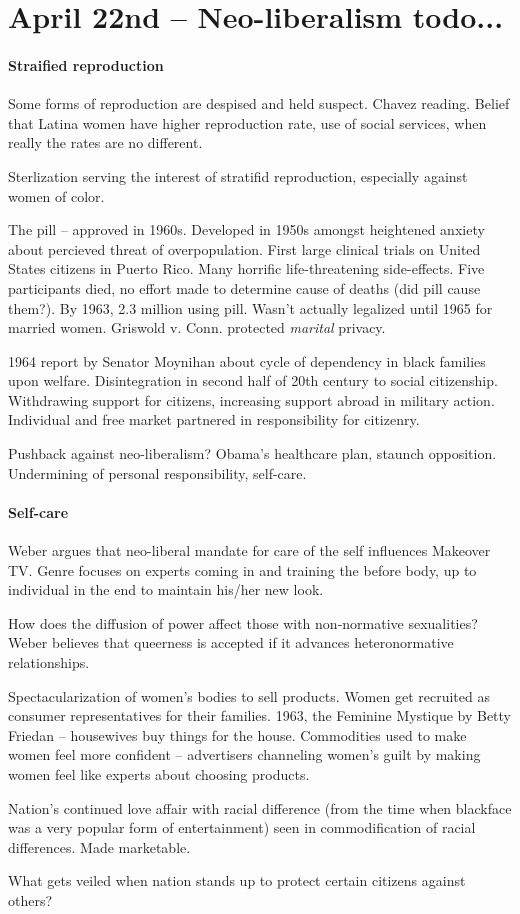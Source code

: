\section{April 22nd -- Neo-liberalism todo... }

\paragraph{Straified reproduction} Some forms of reproduction are despised and held suspect. Chavez reading. Belief that Latina women have higher reproduction rate, use of social services, when really the rates are no different.

Sterlization serving the interest of stratifid reproduction, especially against women of color.

The pill -- approved in 1960s. Developed in 1950s amongst heightened anxiety about percieved threat of overpopulation. First large clinical trials on United States citizens in Puerto Rico. Many horrific life-threatening side-effects. Five participants died, no effort made to determine cause of deaths (did pill cause them?). By 1963, 2.3 million using pill. Wasn't actually legalized until 1965 for married women. Griswold v. Conn. protected \textit{marital} privacy.

1964 report by Senator Moynihan about cycle of dependency in black families upon welfare. Disintegration in second half of 20th century to social citizenship. Withdrawing support for citizens, increasing support abroad in military action. Individual and free market partnered in responsibility for citizenry.

Pushback against neo-liberalism? Obama's healthcare plan, staunch opposition. Undermining of personal responsibility, self-care. 

\paragraph{Self-care} Weber argues that neo-liberal mandate for care of the self influences Makeover TV. Genre focuses on experts coming in and training the before body, up to individual in the end to maintain his/her new look.

How does the diffusion of power affect those with non-normative sexualities? Weber believes that queerness is accepted if it advances heteronormative relationships.

Spectacularization of women's bodies to sell products. Women get recruited as consumer representatives for their families. 1963, the Feminine Mystique by Betty Friedan -- housewives buy things for the house. Commodities used to make women feel more confident -- advertisers channeling women's guilt by making women feel like experts about choosing products.

Nation's continued love affair with racial difference (from the time when blackface was a very popular form of entertainment) seen in commodification of racial differences. Made marketable.

What gets veiled when nation stands up to protect certain citizens against others?